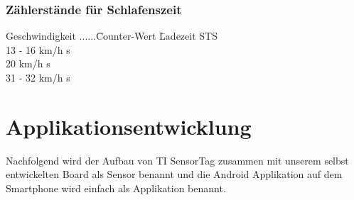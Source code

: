 \subsubsection*{Zählerstände für Schlafenszeit}
\begin{tabbing}
   Geschwindigkeit ......\quad\= Counter-Wert  \quad\= Ladezeit STS\\[0.8ex]
   13 - 16 km/h                          s\\
   20 km/h                                s\\
   31 - 32 km/h                           s\\    
\end{tabbing}



	    







\section{Applikationsentwicklung}
Nachfolgend wird der Aufbau von TI SensorTag zusammen mit unserem selbst entwickelten Board als Sensor benannt und die Android Applikation auf dem Smartphone wird einfach als Applikation benannt.


